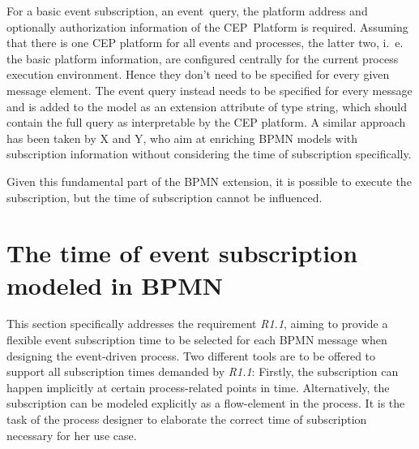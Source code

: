 For a basic event subscription, an event~query, the platform address and optionally authorization information of the CEP~Platform is required. 
Assuming that there is one CEP platform for all events and processes, the latter two, i.~e. the basic platform information, are configured centrally for the current process execution environment. Hence they don't need to be specified for every given message element. 
The event query instead needs to be specified for every message and is added to the model as an extension attribute of type string, which should contain the full query as interpretable by the CEP platform.
A similar approach has been taken by X and Y, who aim at enriching BPMN models with subscription information without considering the time of subscription specifically.

Given this fundamental part of the BPMN extension, it is possible to execute the subscription, but the time of subscription cannot be influenced.

\section{The time of event subscription modeled in BPMN}

This section specifically addresses the requirement \textit{R1.1}, aiming to provide a flexible event subscription time to be selected for each BPMN message when designing the event-driven process.
Two different tools are to be offered to support all subscription times demanded by \textit{R1.1}: Firstly, the subscription can happen implicitly at certain process-related points in time. Alternatively, the subscription can be modeled explicitly as a flow-element in the process.
It is the task of the process designer to elaborate the correct time of subscription necessary for her use case.

